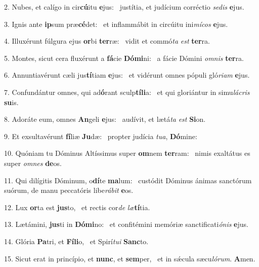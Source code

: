 2. Nubes, et calígo in cir\textbf{cú}itu \textbf{e}jus: \ast\  justítia, et judícium corréctio \textit{se}\textit{dis} \textbf{e}jus.\

3. Ignis ante \textbf{ip}sum præ\textbf{cé}det: \ast\  et inflammábit in circúitu ini\textit{mí}\textit{cos} \textbf{e}jus.\

4. Illuxérunt fúlgura ejus \textbf{or}bi \textbf{ter}ræ: \ast\  vidit et commó\textit{ta} \textit{est} \textbf{ter}ra.\

5. Montes, sicut cera fluxérunt a \textbf{fá}cie \textbf{Dó}\textbf{mi}ni: \ast\  a fácie Dómini \textit{om}\textit{nis} \textbf{ter}ra.\

6. Annuntiavérunt cæli jus\textbf{tí}tiam \textbf{e}jus: \ast\  et vidérunt omnes pópuli gló\textit{ri}\textit{am} \textbf{e}jus.\

7. Confundántur omnes, qui ad\textbf{ó}rant sculp\textbf{tí}\textbf{li}a: \ast\  et qui gloriántur in simu\textit{lá}\textit{cris} \textbf{su}is.\

8. Adoráte eum, omnes \textbf{An}geli \textbf{e}jus: \ast\  audívit, et lætá\textit{ta} \textit{est} \textbf{Si}on.\

9. Et exsultavérunt \textbf{fí}liæ \textbf{Ju}dæ: \ast\  propter judícia \textit{tu}\textit{a}, \textbf{Dó}mine:\

10. Quóniam tu Dóminus Altíssimus super \textbf{om}nem \textbf{ter}ram: \ast\  nimis exaltátus es super \textit{om}\textit{nes} \textbf{de}os.\

11. Qui dilígitis Dóminum, o\textbf{dí}te \textbf{ma}lum: \ast\  custódit Dóminus ánimas sanctórum suórum, de manu peccatóris libe\textit{rá}\textit{bit} \textbf{e}os.\

12. Lux \textbf{or}ta est \textbf{jus}to, \ast\  et rectis cor\textit{de} \textit{læ}\textbf{tí}tia.\

13. Lætámini, \textbf{jus}ti in \textbf{Dó}\textbf{mi}no: \ast\  et confitémini memóriæ sanctificati\textit{ó}\textit{nis} \textbf{e}jus.\

14. Glória \textbf{Pa}tri, et \textbf{Fí}\textbf{li}o, \ast\  et Spirí\textit{tu}\textit{i} \textbf{Sanc}to.\

15. Sicut erat in princípio, et \textbf{nunc}, et \textbf{sem}per, \ast\  et in sǽcula sæcu\textit{ló}\textit{rum}. \textbf{A}men.\

